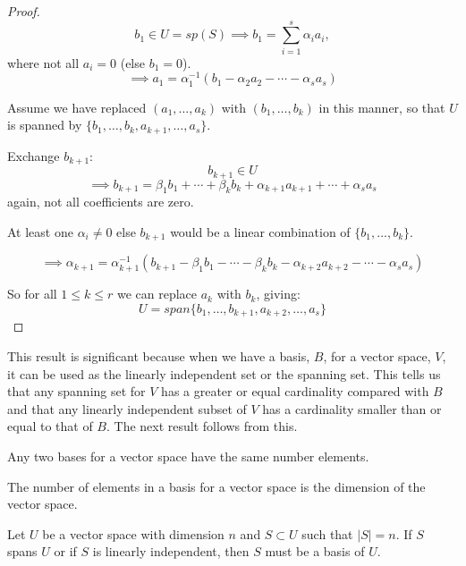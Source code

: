 \documentclass[a4paper,10pt]{article}
\begin{document}
\begin{proof}
	\[
		b_1 \in U = sp(S)
		\implies b_1 = \sum_{i=1}^s \alpha_i a_i,
	\]
	where not all $a_i = 0$ (else $b_1 = 0$).
	\[
		\implies a_1 = \alpha_1^{-1}
		( b_1 - \alpha_2 a_2 - \cdots - \alpha_s a_s )
	\]

	Assume we have replaced $(a_1, \ldots, a_k)$ with
	$(b_1, \ldots, b_k)$ in this manner, so that
	$U$ is spanned by $\{ b_1, \ldots, b_k, a_{k+1}, \ldots, a_s \}$.

	Exchange $b_{k+1}$:
	\[ b_{k+1} \in U \]
	\[
		\implies b_{k+1} =
		\beta_1 b_1 + \cdots + \beta_k b_k
		+ \alpha_{k+1} a_{k+1} + \cdots + \alpha_s a_s
	\]
	again, not all coefficients are zero.

	At least one $\alpha_i \neq 0$ else $b_{k+1}$ would be a linear
	combination of $\{ b_1, \ldots, b_k \}$.

	\[
		\implies \alpha_{k+1} = \alpha_{k+1}^{-1}
		(
			b_{k+1} - \beta_1 b_1 - \cdots - \beta_k b_k
			- \alpha_{k+2} a_{k+2} - \cdots - \alpha_s a_s
		)
	\]

	So for all $1 \leq k \leq r$ we can replace $a_k$ with $b_k$, giving:
	\[
		U = span \{ b_1, \ldots, b_{k+1}, a_{k+2}, \ldots, a_s \}
	\]
\end{proof}

This result is significant because when we have a basis, $B$, for a
vector space, $V$, it can be used as the linearly independent set or the
spanning set. This tells us that any spanning set for $V$ has a greater
or equal cardinality compared with $B$ and that any linearly independent
subset of $V$ has a cardinality smaller than or equal to that of $B$.
The next result follows from this.

\begin{cor}
	Any two bases for a vector space have the same number elements.
\end{cor}

\begin{defn}[Dimension]
	The number of elements in a basis for a vector space is the dimension of the vector space.
\end{defn}

\begin{rem}
	Let $U$ be a vector space with dimension $n$ and $S \subset U$
	such that $|S| = n$. If $S$ spans $U$ or if $S$ is linearly
	independent, then $S$ must be a basis of $U$.
\end{rem}
\end{document}
